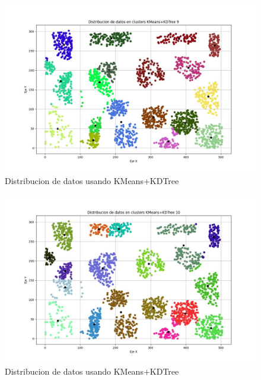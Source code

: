\documentclass[conference]{IEEEtran}
\begin{document}
\begin{figure}[htbp]
    \centering
    \includegraphics[width=1\linewidth]{figures/kdtree9.jpeg} %
    \caption{Distribucion de datos usando KMeans+KDTree}
    \label{fig:kdtree9}
\end{figure}
\begin{figure}[htbp]
    \centering
    \includegraphics[width=1\linewidth]{figures/kdtree10.jpeg} %
    \caption{Distribucion de datos usando KMeans+KDTree}
    \label{fig:kdtree10}
\end{figure}
\end{document}
